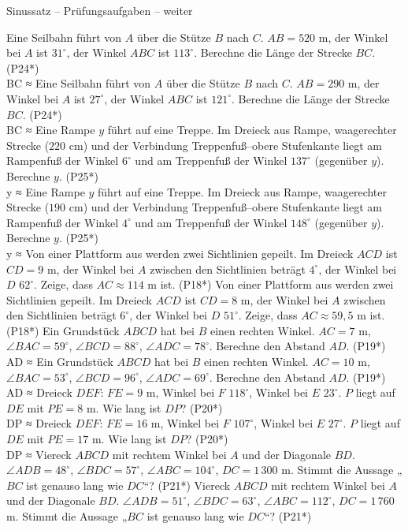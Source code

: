 \begin{aufgabe}{Sinussatz – Prüfungsaufgaben – weiter}
\begin{teile}
\steil Eine Seilbahn führt von $A$ über die Stütze $B$ nach $C$. $AB = 520$ m, der Winkel bei $A$ ist $31^\circ$, der Winkel $ABC$ ist $113^\circ$. Berechne die Länge der Strecke $BC$. \hfill (P24*) \\ BC ≈ \leerfeld[m]
\steil Eine Seilbahn führt von $A$ über die Stütze $B$ nach $C$. $AB = 290$ m, der Winkel bei $A$ ist $27^\circ$, der Winkel $ABC$ ist $121^\circ$. Berechne die Länge der Strecke $BC$. \hfill (P24*) \\ BC ≈ \leerfeld[m]
\steil Eine Rampe $y$ führt auf eine Treppe. Im Dreieck aus Rampe, waagerechter Strecke ($220$ cm) und der Verbindung Treppenfuß–obere Stufenkante liegt am Rampenfuß der Winkel $6^\circ$ und am Treppenfuß der Winkel $137^\circ$ (gegenüber $y$). Berechne $y$. \hfill (P25*) \\ y ≈ \leerfeld[cm]
\steil Eine Rampe $y$ führt auf eine Treppe. Im Dreieck aus Rampe, waagerechter Strecke ($190$ cm) und der Verbindung Treppenfuß–obere Stufenkante liegt am Rampenfuß der Winkel $4^\circ$ und am Treppenfuß der Winkel $148^\circ$ (gegenüber $y$). Berechne $y$. \hfill (P25*) \\ y ≈ \leerfeld[cm]
\steil Von einer Plattform aus werden zwei Sichtlinien gepeilt. Im Dreieck $ACD$ ist $CD = 9$ m, der Winkel bei $A$ zwischen den Sichtlinien beträgt $4^\circ$, der Winkel bei $D$ $62^\circ$. Zeige, dass $AC \approx 114$ m ist. \hfill (P18*)
\steil Von einer Plattform aus werden zwei Sichtlinien gepeilt. Im Dreieck $ACD$ ist $CD = 8$ m, der Winkel bei $A$ zwischen den Sichtlinien beträgt $6^\circ$, der Winkel bei $D$ $51^\circ$. Zeige, dass $AC \approx 59{,}5$ m ist. \hfill (P18*)
\steil Ein Grundstück $ABCD$ hat bei $B$ einen rechten Winkel. $AC = 7$ m, $\angle BAC = 59^\circ$, $\angle BCD = 88^\circ$, $\angle ADC = 78^\circ$. Berechne den Abstand $AD$. \hfill (P19*) \\ AD ≈ \leerfeld[m]
\steil Ein Grundstück $ABCD$ hat bei $B$ einen rechten Winkel. $AC = 10$ m, $\angle BAC = 53^\circ$, $\angle BCD = 96^\circ$, $\angle ADC = 69^\circ$. Berechne den Abstand $AD$. \hfill (P19*) \\ AD ≈ \leerfeld[m]
\steil Dreieck $DEF$: $FE = 9$ m, Winkel bei $F$ $118^\circ$, Winkel bei $E$ $23^\circ$. $P$ liegt auf $DE$ mit $PE = 8$ m. Wie lang ist $DP$? \hfill (P20*) \\ DP ≈ \leerfeld[m]
\steil Dreieck $DEF$: $FE = 16$ m, Winkel bei $F$ $107^\circ$, Winkel bei $E$ $27^\circ$. $P$ liegt auf $DE$ mit $PE = 17$ m. Wie lang ist $DP$? \hfill (P20*) \\ DP ≈ \leerfeld[m]
\steil Viereck $ABCD$ mit rechtem Winkel bei $A$ und der Diagonale $BD$. $\angle ADB = 48^\circ$, $\angle BDC = 57^\circ$, $\angle ABC = 104^\circ$, $DC = 1\,300$ m. Stimmt die Aussage „$BC$ ist genauso lang wie $DC$“? \hfill (P21*)
\steil Viereck $ABCD$ mit rechtem Winkel bei $A$ und der Diagonale $BD$. $\angle ADB = 51^\circ$, $\angle BDC = 63^\circ$, $\angle ABC = 112^\circ$, $DC = 1\,760$ m. Stimmt die Aussage „$BC$ ist genauso lang wie $DC$“? \hfill (P21*)
\end{teile}
\end{aufgabe}

